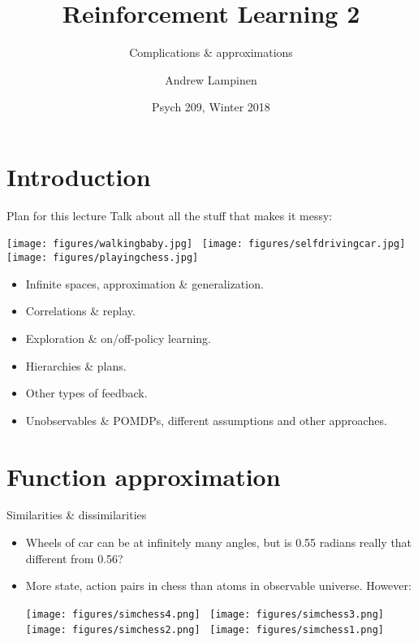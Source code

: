 \documentclass{beamer} %
\begin{document}
\title{Reinforcement Learning 2}
\subtitle{Complications \& approximations}
\author{Andrew Lampinen}
\date{Psych 209, Winter 2018}
\frame{\titlepage}


\section{Introduction}
\begin{frame}{Plan for this lecture}
Talk about all the stuff that makes it messy: 
\begin{center}
    \texttt{[image: figures/walkingbaby.jpg]}~
    \texttt{[image: figures/selfdrivingcar.jpg]}~
    \texttt{[image: figures/playingchess.jpg]}
\end{center}
\vspace{-1em}
\begin{itemize}
    \item<2-> Infinite spaces, approximation \& generalization.
    \item<3-> Correlations \& replay.
    \item<4-> Exploration \& on/off-policy learning.
    \item<5-> Hierarchies \& plans.
    \item<6-> Other types of feedback.
    \item<7-> Unobservables \& POMDPs, different assumptions and other approaches.
\end{itemize}
\end{frame}

\section{Function approximation}

\begin{frame}{Similarities \& dissimilarities}
\begin{itemize}
    \item Wheels of car can be at infinitely many angles, but is 0.55 radians really that different from 0.56?
    \item<2-> More state, action pairs in chess than atoms in observable universe. However: \vspace{0.5em} 
    \begin{center}
        \texttt{[image: figures/simchess4.png]}~
        \texttt{[image: figures/simchess3.png]} \\[5pt]
        \texttt{[image: figures/simchess2.png]}~
        \texttt{[image: figures/simchess1.png]}
    \end{center}
\end{itemize}
\end{frame}
\end{document}
